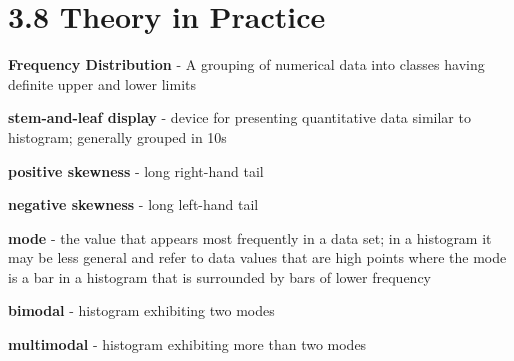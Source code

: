 \documentclass[
10pt,reqno
]{amsart}
\theoremstyle{definition}
\begin{document}
\section*{3.8 Theory in Practice}

\textbf{Frequency Distribution} - A grouping of numerical data into classes having definite upper and lower limits

\textbf{stem-and-leaf display} - device for presenting quantitative data similar to histogram; generally grouped in 10s

\textbf{positive skewness} - long right-hand tail

\textbf{negative skewness} - long left-hand tail

\textbf{mode} - the value that appears most frequently in a data set; in a histogram it may be less general and refer to data values that are high points where the mode is a bar in a histogram that is surrounded by bars of lower frequency

\textbf{bimodal} - histogram exhibiting two modes

\textbf{multimodal} - histogram exhibiting more than two modes
\end{document}
